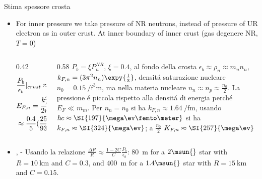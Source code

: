 \begin{frame}{Stima spessore crosta}
    \begin{itemize}
        \item For inner pressure we take pressure of NR neutrons, instead of pressure of UR electron as in outer crust. At inner boundary of inner crust (gas degenere NR, $T=0$)
            \begin{columns}[T]
                \begin{column}{0.42\textwidth}
            \begin{align*}
                &\frac{P_b}{\epsilon_b}|_{crust}\approx\xi \frac{P_n^{NR}}{\rho_n}=\frac{\xi}{5}(3\pi^2)\expy{\frac{2}{3}}\frac{n_n\expy{\frac{2}{3}}}{m_n^2}=\frac{\xi}{5}\frac{k_{F,n}^2}{m_n^2}\\
                &E_{F,n}=\frac{k_{F,n}^2}{2m_n}\Rightarrow \frac{P_b}{\epsilon_b}\approx \frac{2\xi}{5}\frac{E_{F,n}}{m_n}\\
                &\approx \frac{0.4}{5}(\frac{257}{939})^2\approx\num{6e-3}
            \end{align*}
                \end{column}
                \begin{column}{0.58\textwidth}
                    $P_b=\xi P_n^{NR}$, $\xi=0.4$, al fondo della crosta $\epsilon_b\approx\rho_n\approx m_nn_n$, $k_{F,n}=(3\pi^2n_n)\expy{\frac{1}{3}}$, densit\'a saturazione nucleare $n_0=\SI{0.15}{\per\cubic\femto\meter}$, ma nella materia nucleare $n_n\approx n_p\approx \frac{n_0}{2}$. La pressione \'e piccola rispetto alla densit\'a di energia perch\'e $E_F\ll m_m$. Per $n_n=n_0$ si ha $k_{F,n}\approx\SI{1.64}{\per\femto\meter}$, usando $\hbar c\approx\SI{197}{\mega\ev\femto\meter}$ si ha $k_{F,n}\approx\SI{324}{\mega\ev}$; a $\frac{n_0}{2}$ $K_{F,n}\approx\SI{257}{\mega\ev}$
                \end{column}
            \end{columns}
                   
        \item {},  - Usando la relazione $\frac{\Delta R}{R}\approx \frac{1-2C}{C}\frac{P_b}{\epsilon_b}$: \SI{80}{\meter} for a $2\msun{}$ star with $R=\SI{10}{\kilo\meter}$ and $C=0.3$, and \SI{400}{\meter} for a $1.4\msun{}$ star with $R=\SI{15}{\kilo\meter}$ and $C=0.15$.
            
    \end{itemize}
\end{frame}

